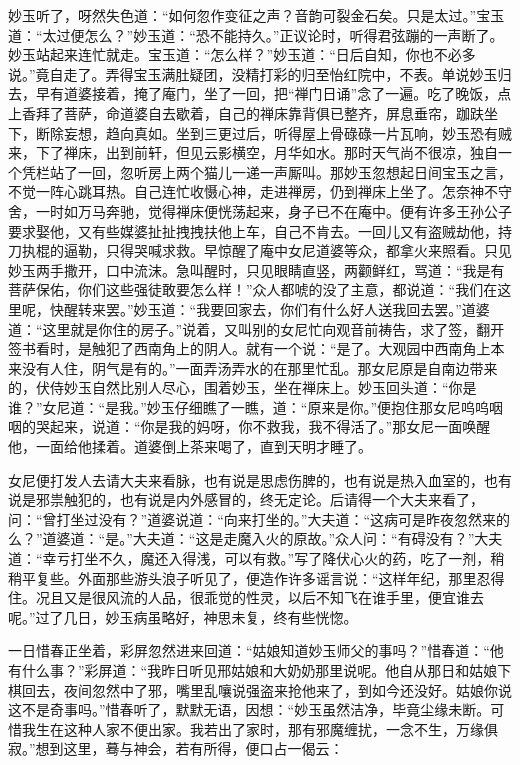 \begin{parag}
    妙玉听了，呀然失色道：“如何忽作变征之声？音韵可裂金石矣。只是太过。”宝玉道：“太过便怎么？”妙玉道：“恐不能持久。”正议论时，听得君弦蹦的一声断了。妙玉站起来连忙就走。宝玉道：“怎么样？”妙玉道：“日后自知，你也不必多说。”竟自走了。弄得宝玉满肚疑团，没精打彩的归至怡红院中，不表。单说妙玉归去，早有道婆接着，掩了庵门，坐了一回，把“禅门日诵”念了一遍。吃了晚饭，点上香拜了菩萨，命道婆自去歇着，自己的禅床靠背俱已整齐，屏息垂帘，跏趺坐下，断除妄想，趋向真如。坐到三更过后，听得屋上骨碌碌一片瓦响，妙玉恐有贼来，下了禅床，出到前轩，但见云影横空，月华如水。那时天气尚不很凉，独自一个凭栏站了一回，忽听房上两个猫儿一递一声厮叫。那妙玉忽想起日间宝玉之言，不觉一阵心跳耳热。自己连忙收慑心神，走进禅房，仍到禅床上坐了。怎奈神不守舍，一时如万马奔驰，觉得禅床便恍荡起来，身子已不在庵中。便有许多王孙公子要求娶他，又有些媒婆扯扯拽拽扶他上车，自己不肯去。一回儿又有盗贼劫他，持刀执棍的逼勒，只得哭喊求救。早惊醒了庵中女尼道婆等众，都拿火来照看。只见妙玉两手撒开，口中流沫。急叫醒时，只见眼睛直竖，两颧鲜红，骂道：“我是有菩萨保佑，你们这些强徒敢要怎么样！”众人都唬的没了主意，都说道：“我们在这里呢，快醒转来罢。”妙玉道：“我要回家去，你们有什么好人送我回去罢。”道婆道：“这里就是你住的房子。”说着，又叫别的女尼忙向观音前祷告，求了签，翻开签书看时，是触犯了西南角上的阴人。就有一个说：“是了。大观园中西南角上本来没有人住，阴气是有的。”一面弄汤弄水的在那里忙乱。那女尼原是自南边带来的，伏侍妙玉自然比别人尽心，围着妙玉，坐在禅床上。妙玉回头道：“你是谁？”女尼道：“是我。”妙玉仔细瞧了一瞧，道：“原来是你。”便抱住那女尼呜呜咽咽的哭起来，说道：“你是我的妈呀，你不救我，我不得活了。”那女尼一面唤醒他，一面给他揉着。道婆倒上茶来喝了，直到天明才睡了。
\end{parag}


\begin{parag}
    女尼便打发人去请大夫来看脉，也有说是思虑伤脾的，也有说是热入血室的，也有说是邪祟触犯的，也有说是内外感冒的，终无定论。后请得一个大夫来看了，问：“曾打坐过没有？”道婆说道：“向来打坐的。”大夫道：“这病可是昨夜忽然来的么？”道婆道：“是。”大夫道：“这是走魔入火的原故。”众人问：“有碍没有？”大夫道：“幸亏打坐不久，魔还入得浅，可以有救。”写了降伏心火的药，吃了一剂，稍稍平复些。外面那些游头浪子听见了，便造作许多谣言说：“这样年纪，那里忍得住。况且又是很风流的人品，很乖觉的性灵，以后不知飞在谁手里，便宜谁去呢。”过了几日，妙玉病虽略好，神思未复，终有些恍惚。
\end{parag}


\begin{parag}
    一日惜春正坐着，彩屏忽然进来回道：“姑娘知道妙玉师父的事吗？”惜春道：“他有什么事？”彩屏道：“我昨日听见邢姑娘和大奶奶那里说呢。他自从那日和姑娘下棋回去，夜间忽然中了邪，嘴里乱嚷说强盗来抢他来了，到如今还没好。姑娘你说这不是奇事吗。”惜春听了，默默无语，因想：“妙玉虽然洁净，毕竟尘缘未断。可惜我生在这种人家不便出家。我若出了家时，那有邪魔缠扰，一念不生，万缘俱寂。”想到这里，蓦与神会，若有所得，便口占一偈云：
\end{parag}

